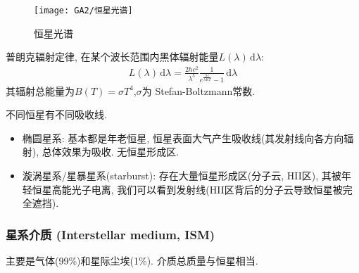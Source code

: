 \quad

\quad

\begin{figure}[htb]
    \centering
    \texttt{[image: GA2/恒星光谱]}
    \caption{恒星光谱}
\end{figure}

普朗克辐射定律, 在某个波长范围内黑体辐射能量$L(\lambda)\,\mathrm{d}\lambda$: 
\begin{align*}
    L(\lambda)\,\mathrm{d}\lambda =\frac{2hc^2}{\lambda^5}\frac{1}{e^{\frac{hc}{\lambda K T}}-1} \, \mathrm{d}\lambda
\end{align*}
其辐射总能量为$B(T)=\sigma T^4$,$\sigma$为 Stefan-Boltzmann常数. 

不同恒星有不同吸收线. 

\begin{itemize}
    \item 椭圆星系: 基本都是年老恒星, 恒星表面大气产生吸收线(其发射线向各方向辐射), 总体效果为吸收. 无恒星形成区. 
    \item 漩涡星系/星暴星系(starburst): 存在大量恒星形成区(分子云, HII区), 其被年轻恒星高能光子电离, 我们可以看到发射线(HII区背后的分子云导致恒星被完全遮挡). 
\end{itemize} 

\subsubsection{星系介质 (Interstellar medium, ISM)}
主要是气体(99\%)和星际尘埃(1\%). 介质总质量与恒星相当. 

